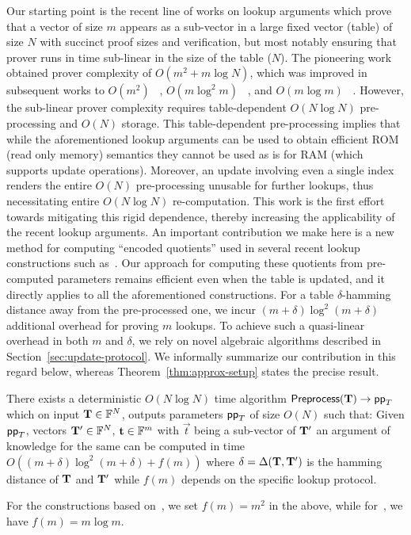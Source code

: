  Our starting point is the recent line of works on lookup arguments which prove
that a vector of size $m$ appears as
a sub-vector in a large fixed vector (table) of size $N$ with succinct proof sizes and verification, but most notably
ensuring that prover runs in time sub-linear in the size of the table ($N$). The pioneering work ~\cite{CCS:ZBKMNS22}
obtained prover complexity of $O(m^2+m\log N)$, which was improved in subsequent works to $O(m^2)$ ~\cite{EPRINT:PosKat22},
$O(m\log^2 m)$ ~\cite{EPRINT:ZGKMR22}, and $O(m\log m)$ ~\cite{EPRINT:EagFioGab22,PKC:CFFLL24}. However, the sub-linear prover
complexity requires table-dependent $O(N\log N)$ pre-processing and $O(N)$ storage. This table-dependent
pre-processing implies that while
the aforementioned lookup arguments can be used to obtain efficient ROM (read only memory) semantics
they cannot be used as is for RAM (which supports update operations).
Moreover, an update involving even a single
index renders the entire $O(N)$ pre-processing unusable for further lookups,
thus necessitating entire $O(N\log N)$ re-computation. This work is the first effort towards
mitigating this rigid dependence, thereby increasing the applicability of the recent lookup arguments.
An important contribution we make here is a new method for computing ``encoded quotients'' used in several
recent lookup constructions such as~\cite{CCS:ZBKMNS22,EPRINT:PosKat22,EPRINT:EagFioGab22,PKC:CFFLL24}.
Our approach for computing these quotients from pre-computed parameters remains efficient even when
the table is updated, and it directly applies to all the aforementioned constructions.
For a table $\delta$-hamming distance away from the pre-processed one, we incur
$(m+\delta)\log^2(m+\delta)$ additional overhead for proving $m$ lookups. To achieve such a quasi-linear overhead in both $m$ and $\delta$, we rely on novel algebraic algorithms described in Section~\ref{sec:update-protocol}.
We informally summarize our contribution in this regard below, whereas Theorem~\ref{thm:approx-setup}
states the precise result.
\begin{theorem}[Informal]\label{thm:pre-process}
	There exists a deterministic $O(N\log N)$ time algorithm $\textsf{Preprocess}(\mathbf{T})\rightarrow \mathsf{pp}_T$
	which on input $\mathbf{T}\in \mathbb{F}^N$, outputs parameters $\mathsf{pp}_T$ of size $O(N)$ such
	that: Given $\mathsf{pp}_T$, vectors $\mathbf{T}'\in \mathbb{F}^N$, $\mathbf{t}\in \mathbb{F}^m$ with $\vec{t}$ being a sub-vector of $\mathbf{T}'$
	an argument of knowledge for the same can be computed in time
	$O((m+\delta)\log^2 (m+\delta) + f(m))$ where $\delta=\Delta(\mathbf{T}, \mathbf{T}')$
	is the hamming distance of $\mathbf{T}$ and $\mathbf{T}'$ while $f(m)$ depends on the specific lookup protocol.
\end{theorem}
For the constructions based on~\cite{CCS:ZBKMNS22,EPRINT:PosKat22}, we set $f(m)=m^2$ in the above,
while for~\cite{EPRINT:EagFioGab22,PKC:CFFLL24}, we have $f(m)=m\log m$.

